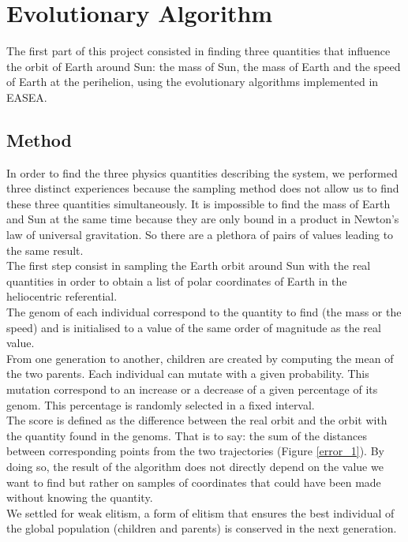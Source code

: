 \section{Evolutionary Algorithm}
\label{evol}
The first part of this project consisted in finding three quantities that
influence the orbit of Earth around Sun: the mass of Sun, the mass of Earth and
the speed of Earth at the perihelion, using the evolutionary algorithms
implemented in EASEA.\\

\subsection{Method}
In order to find the three physics quantities describing the system, we
performed three distinct experiences because the
sampling method does not allow us to find these three quantities
simultaneously. It is impossible to find the mass of Earth and Sun at the same
time because they are only bound in a product in Newton's law of universal
gravitation. So there are a plethora of pairs of values leading to the same
result.\\

The first step consist in sampling the Earth orbit around Sun with the real
quantities in order to obtain a list of polar coordinates of Earth in the
heliocentric referential.\\
The genom of each individual correspond to the quantity to find (the mass or
the speed) and is initialised to a value of the same order of magnitude as the
real value.\\
From one generation to another, children are created by computing the mean of
the two parents. Each individual can mutate with a given probability. This
mutation correspond to an increase or a decrease of a given percentage of its
genom. This percentage is randomly selected in a fixed interval.\\
The score is defined as the difference between the real orbit and the orbit
with the quantity found in the genoms. That is to say: the sum of the distances
between corresponding points from the two trajectories (Figure \ref{error_1}). By
doing so, the
result of the algorithm does not directly depend on the value we want to find
but rather on samples of coordinates that could have been made without knowing
the quantity.\\
We settled for weak elitism, a form of elitism that ensures the best individual
of the global population (children and parents) is conserved in the next
generation.

